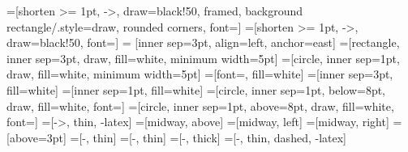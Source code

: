 =[shorten >= 1pt, ->, draw=black!50, framed, background rectangle/.style={draw, rounded corners}, font=\scriptsize ]
=[shorten >= 1pt, ->, draw=black!50, font=\scriptsize]
 = [inner sep=3pt, align=left, anchor=east]
=[rectangle, inner sep=3pt, draw, fill=white, minimum width=5pt]
=[circle, inner sep=1pt, draw, fill=white, minimum width=5pt]
=[font=\Large, fill=white]
=[inner sep=3pt, fill=white]
=[inner sep=1pt, fill=white]
=[circle, inner sep=1pt, below=8pt, draw, fill=white, font=\tiny]
=[circle, inner sep=1pt, above=8pt, draw, fill=white, font=\tiny]
=[->, thin, -latex]
=[midway, above]
=[midway, left]
=[midway, right]
=[above=3pt]
=[-, thin]
=[-, thin]
=[-, thick]
=[-, thin, dashed, -latex]

\newcommand{\ridX}{-0.3}
\newcommand{\ridY}{0.5}
\newcommand{\lhsX}{-0.3}
\newcommand{\pipeUY}{-0.5}
\newcommand{\pipeBY}{0.5}

